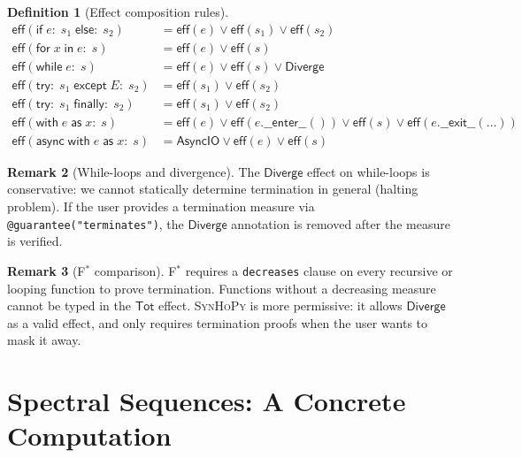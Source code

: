 \documentclass[11pt,a4paper]{report}
\theoremstyle{definition}
\newtheorem{definition}{Definition}[chapter]
\newtheorem{remark}[definition]{Remark}
\theoremstyle{plain}
\newcommand{\fstar}{F$^{*}$}
\newcommand{\synhopy}{\textsc{SynHoPy}}
\begin{document}
\begin{definition}[Effect composition rules]
\label{def:effect-composition}
\begin{align}
  \mathsf{eff}(\mathsf{if}\;e\!:\;s_1\;\mathsf{else}\!:\;s_2)
    &= \mathsf{eff}(e) \vee \mathsf{eff}(s_1) \vee \mathsf{eff}(s_2) \\
  \mathsf{eff}(\mathsf{for}\;x\;\mathsf{in}\;e\!:\;s)
    &= \mathsf{eff}(e) \vee \mathsf{eff}(s) \\
  \mathsf{eff}(\mathsf{while}\;e\!:\;s)
    &= \mathsf{eff}(e) \vee \mathsf{eff}(s) \vee \mathsf{Diverge} \\
  \mathsf{eff}(\mathsf{try}\!:\;s_1\;\mathsf{except}\;E\!:\;s_2)
    &= \mathsf{eff}(s_1) \vee \mathsf{eff}(s_2) \\
  \mathsf{eff}(\mathsf{try}\!:\;s_1\;\mathsf{finally}\!:\;s_2)
    &= \mathsf{eff}(s_1) \vee \mathsf{eff}(s_2) \\
  \mathsf{eff}(\mathsf{with}\;e\;\mathsf{as}\;x\!:\;s)
    &= \mathsf{eff}(e) \vee \mathsf{eff}(e.\mathsf{\_\_enter\_\_}())
       \vee \mathsf{eff}(s) \vee \mathsf{eff}(e.\mathsf{\_\_exit\_\_}(\ldots)) \\
  \mathsf{eff}(\mathsf{async\;with}\;e\;\mathsf{as}\;x\!:\;s)
    &= \mathsf{AsyncIO} \vee \mathsf{eff}(e) \vee \mathsf{eff}(s)
\end{align}
\end{definition}

\begin{remark}[While-loops and divergence]
The $\mathsf{Diverge}$ effect on while-loops is conservative: we cannot
statically determine termination in general (halting problem).  If the user
provides a termination measure via \lstinline[style=synhopy]{@guarantee("terminates")},
the $\mathsf{Diverge}$ annotation is removed after the measure is verified.
\end{remark}

\begin{remark}[\fstar{} comparison]
\fstar{} requires a \lstinline[style=fstar]{decreases} clause on every
recursive or looping function to prove termination.  Functions without a
decreasing measure cannot be typed in the $\mathsf{Tot}$ effect.  \synhopy{}
is more permissive: it allows $\mathsf{Diverge}$ as a valid effect, and
only requires termination proofs when the user wants to mask it away.
\end{remark}


\section{Spectral Sequences: A Concrete Computation}
\end{document}
